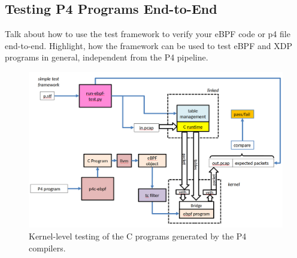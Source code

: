 \subsection{Testing P4 Programs End-to-End}
Talk about how to use the test framework to verify your eBPF code or p4 file
end-to-end. Highlight, how the framework can be used to test eBPF and XDP
programs in general, independent from the P4 pipeline.
\begin{figure}
	\centering
	\includegraphics[width=\linewidth]{kernel_test}
	\caption{Kernel-level testing of the C programs generated by the P4 compilers.}
	\label{fig:kernel_test}
\end{figure}
